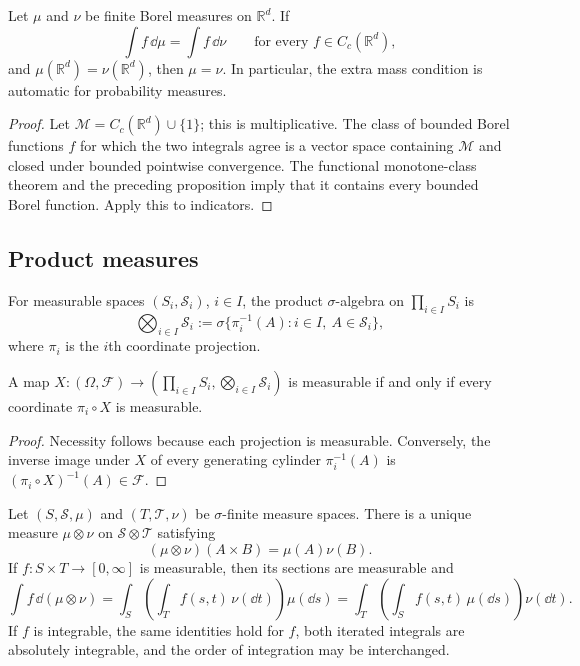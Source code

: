 \begin{thm}
Let $\mu$ and $\nu$ be finite Borel measures on $\mathbb R^d$. If
\[
\int f\,\dd\mu=\int f\,\dd\nu
\qquad\text{for every }f\in C_c(\mathbb R^d),
\]
and $\mu(\mathbb R^d)=\nu(\mathbb R^d)$, then $\mu=\nu$. In particular, the
extra mass condition is automatic for probability measures.
\end{thm}

\begin{proof}
Let $\mathcal M=C_c(\mathbb R^d)\cup\{1\}$; this is multiplicative. The class
of bounded Borel functions $f$ for which the two integrals agree is a vector
space containing $\mathcal M$ and closed under bounded pointwise convergence.
The functional monotone-class theorem and the preceding proposition imply
that it contains every bounded Borel function. Apply this to indicators.
\end{proof}

\subsection{Product measures}

\begin{de}
For measurable spaces $(S_i,\mathcal S_i)$, $i\in I$, the product
$\sigma$-algebra on $\prod_{i\in I}S_i$ is
\[
\bigotimes_{i\in I}\mathcal S_i
 :=\sigma\{\pi_i^{-1}(A):i\in I,\ A\in\mathcal S_i\},
\]
where $\pi_i$ is the $i$th coordinate projection.
\end{de}

\begin{prop}
A map $X:(\Omega,\mathcal F)\to
(\prod_{i\in I}S_i,\bigotimes_{i\in I}\mathcal S_i)$ is measurable if and
only if every coordinate $\pi_i\circ X$ is measurable.
\end{prop}

\begin{proof}
Necessity follows because each projection is measurable. Conversely, the
inverse image under $X$ of every generating cylinder
$\pi_i^{-1}(A)$ is $(\pi_i\circ X)^{-1}(A)\in\mathcal F$.
\end{proof}

\begin{thm}
Let $(S,\mathcal S,\mu)$ and $(T,\mathcal T,\nu)$ be $\sigma$-finite measure
spaces. There is a unique measure $\mu\otimes\nu$ on
$\mathcal S\otimes\mathcal T$ satisfying
\[
(\mu\otimes\nu)(A\times B)=\mu(A)\nu(B).
\]
If $f:S\times T\to[0,\infty]$ is measurable, then its sections are
measurable and
\[
\int f\,\dd(\mu\otimes\nu)
 =\int_S\!\left(\int_T f(s,t)\,\nu(\dd t)\right)\mu(\dd s)
 =\int_T\!\left(\int_S f(s,t)\,\mu(\dd s)\right)\nu(\dd t).
\]
If $f$ is integrable, the same identities hold for $f$, both iterated
integrals are absolutely integrable, and the order of integration may be
interchanged.
\end{thm}

